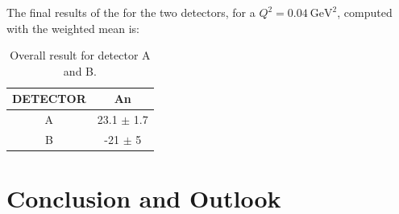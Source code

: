 The final results of the \transv for the two detectors, for a $Q^{2} = \SI{0.04}{\giga \electronvolt \squared}$, computed with the weighted mean is:

\begin{table}[h]
\centering
\begin{tabular}{c|c}
\hline
 DETECTOR   & An    \\
\hline
 A          & 23.1 $\pm$ 1.7  \\
 B          & -21 $\pm$ 5   \\
\hline
\end{tabular}
\caption{Overall result for detector A and B.}
\end{table}
 

\chapter{Conclusion and Outlook} \label{conclusion}

